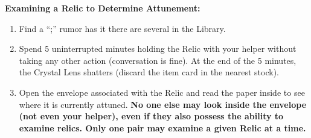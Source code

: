 \documentclass[green]{GL2020}
\begin{document}
\textbf{Examining a Relic to Determine Attunement:}
  \begin{enumerate}
    \item Find a ``\iCrystalLens{};'' rumor has it there are several in the Library. 
    \item Spend 5 uninterrupted minutes holding the Relic with your helper without taking any other action (conversation is fine). At the end of the 5 minutes, the Crystal Lens shatters (discard the item card in the nearest stock). 
    \item Open the envelope associated with the Relic and read the paper inside to see where it is currently attuned. \textbf{No one else may look inside the envelope (not even your helper), even if they also possess the ability to examine relics. Only one pair may examine a given Relic at a time.}
  \end{enumerate}
   
\end{document}
